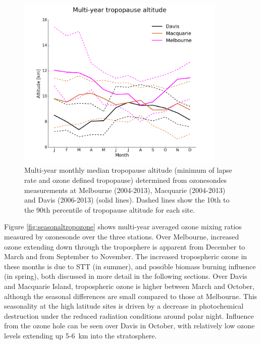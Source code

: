 \documentclass[acp, manuscript]{copernicus} %
\begin{document}
    \begin{figure}[t] 
      \includegraphics[width=10cm]{figures/tpheights.png}
      \caption{%
	Multi-year monthly median tropopause altitude (minimum of lapse rate and ozone defined tropopause) determined from ozonesondes measurements at Melbourne (2004-2013), Macquarie (2004-2013) and Davis (2006-2013) (solid lines).
	Dashed lines show the 10th to the 90th percentile of tropopause altitude for each site.}
      \label{fig:seasonaltpheights}
    \end{figure}

    Figure \ref{fig:seasonaltropozone} shows multi-year averaged ozone mixing ratios measured by ozonesonde over the three stations.
    Over Melbourne, increased ozone extending down through the troposphere is apparent from December to March and from September to November.
    The increased tropospheric ozone in these months is due to STT (in summer), and possible biomass burning influence (in spring), both discussed in more detail in the following sections.
    Over Davis and Macquarie Island, tropospheric ozone is higher between March and October, although the seasonal differences are small compared to those at Melbourne.
    This seasonality at the high latitude sites is driven by a decrease in photochemical destruction under the reduced radiation conditions around polar night. %
    Influence from the ozone hole can be seen over Davis in October, with relatively low ozone levels extending up 5-6~km into the stratosphere.
    
\end{document}
